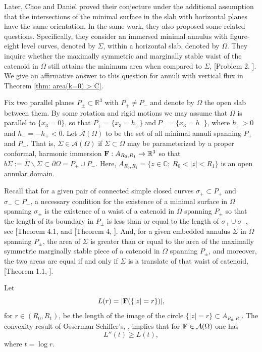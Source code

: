 \documentclass[11pt]{amsart}
\numberwithin{equation}{section}
\theoremstyle{theorem}
\theoremstyle{definition}
\numberwithin{equation}{section}
\begin{document}
Later, Choe and Daniel \cite{choe2016area} proved their conjecture under the additional assumption that the intersections of the minimal surface in the slab with horizontal planes have the same orientation. In the same work, they also proposed some related questions. Specifically, they consider an immersed minimal annulus with figure-eight level curves, denoted by $\Sigma$, within a horizontal slab, denoted by $\Omega$. They inquire whether the maximally symmetric and marginally stable waist of the catenoid in  $\Omega$ still attains the minimum area when compared to $\Sigma$, [Problem 2. \cite{choe2016area}]. We give an affirmative answer to this question for annuli with vertical flux in Theorem \ref{thm: area(k=0) > C}. 
\medskip

Fix two parallel planes $P_{\pm} \subset \mathbb{R}^3$ with $P_{+} \neq P_{-}$ and denote by $\Omega$ the open slab between them. By some rotation and rigid motions we may assume that $\Omega$ is parallel to $\{ x_3 =0 \}$, so that $P_+ = \{ x_3 = h_+ \} \ \text{and}\  P_- = \{ x_3 =h_- \}$, where $h_+ >0$ and $h_- = -h_+< 0$. Let $\mathcal{A} (\Omega )$ to be the set of all minimal annuli spanning $P_+$ and $P_-$. That is, $\Sigma \in \mathcal{A} (\Omega )$ if $\Sigma \subset \Omega$ may be parameterized by a proper conformal, harmonic immersion $\bold{F} : A_{R_0,R_1} \rightarrow \mathbb{R}^3$ so that $b\Sigma := \bar{\Sigma} \backslash \Sigma \subset \partial \Omega = P_+ \cup P_-$. Here, $A_{R_0,R_1} = \{ z\in \mathbb{C};\  R_0<\vert z\vert <R_1   \}$ is an open annular domain. 
\medskip

Recall that for a given pair of connected simple closed curves $\sigma_+ \subset P_+$ and $\sigma_- \subset P_-$, a necessary condition for the existence of a minimal surface in $\Omega$ spanning $\sigma_{\pm}$ is the existence of a waist of a catenoid in $\Omega$ spanning $P_{\pm}$ so that the length of its boundary in $P_{\pm}$ is less than or equal to the length of $\sigma_+ \cup \sigma_-$, see [Theorem 4.1, \cite{bernstein2014variational} and [Theorem 4, \cite{osserman1975doubly}]. And, for a given embedded annulus $\Sigma$ in $\Omega$ spanning $P_{\pm}$, the area of $\Sigma$ is greater than or equal to the area of the maximally symmetric marginally stable piece of a catenoid in $\Omega$ spanning $P_{\pm}$, and moreover, the two areas are equal if and only if $\Sigma$ is a translate of that waist of catenoid, [Theorem 1.1, \cite{bernstein2014variational}].
\medskip
 
Let
\begin{equation}
    \nonumber
    L(r) =\vert \bold{F}(\{ \vert z\vert =r\})\vert ,
\end{equation}
for $r \in (R_0,R_1)$, 
be the length of the image of the circle $\{ \vert z\vert =r \} \subset A_{R_0,R_1}$. The convexity result of Osserman-Schiffer's, \cite{osserman1975doubly}, implies that for $\bold{F}\in \mathcal{A}(\Omega )$ one has
\begin{equation}
    \nonumber
    L''(t) \geq L(t),
\end{equation}
where $t=\log r$.
\medskip
\end{document}
